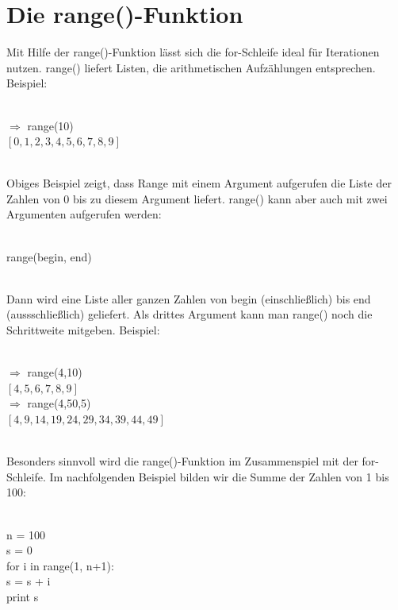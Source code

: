 \section{Die range()-Funktion}
Mit Hilfe der range()-Funktion lässt sich die for-Schleife ideal für Iterationen nutzen. range() liefert Listen, die arithmetischen Aufzählungen entsprechen.
Beispiel: \\
\\
\begin{MyConsoleBox}{
${\Longrightarrow}$ range(10) \\
$[0, 1, 2, 3, 4, 5, 6, 7, 8, 9]$ \\
}\end{MyConsoleBox}
\\
Obiges Beispiel zeigt, dass Range mit einem Argument aufgerufen die Liste der Zahlen von 0 bis zu diesem Argument liefert.
range() kann aber auch mit zwei Argumenten aufgerufen werden: \\
\\
\begin{MyConsoleBox}{
range(begin, end)
}\end{MyConsoleBox}
\\
Dann wird eine Liste aller ganzen Zahlen von begin (einschließlich) bis end (aussschließlich) geliefert.
Als drittes Argument kann man range() noch die Schrittweite mitgeben.
Beispiel: \\
\\
\begin{MyConsoleBox}{
${\Longrightarrow}$ range(4,10) \\
$[4, 5, 6, 7, 8, 9]$ \\
${\Longrightarrow}$ range(4,50,5) \\
$[4, 9, 14, 19, 24, 29, 34, 39, 44, 49]$ \\
}\end{MyConsoleBox}
\\
Besonders sinnvoll wird die range()-Funktion im Zusammenspiel mit der for-Schleife. Im nachfolgenden Beispiel bilden wir die Summe der Zahlen von 1 bis 100: \\
\\
\begin{MyConsoleBox}{
n = 100 \\
s = 0 \\
for i in range(1, n+1): \\
\space{0.5cm}   s = s + i \\
print s \\
}\end{MyConsoleBox}
